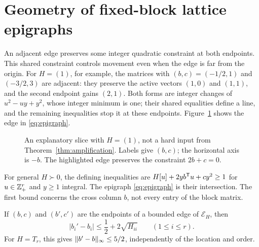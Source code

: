 \section{Geometry of fixed-block lattice epigraphs}\label{sec:movement}
An adjacent edge preserves some integer quadratic constraint at both endpoints. This shared constraint controls movement even when the edge is far from the origin. For $H=(1)$, for example, the matrices with $(b,c)=(-1/2,1)$ and $(-3/2,3)$ are adjacent: they preserve the active vectors $(1,0)$ and $(1,1)$, and the second endpoint gains $(2,1)$. Both forms are integer changes of $u^2-uy+y^2$, whose integer minimum is one; their shared equalities define a line, and the remaining inequalities stop it at these endpoints. Figure~\ref{fig:edge} shows the edge in \eqref{eq:epigraph}.

\begin{figure}[htbp]
\centering
{}
\caption{An explanatory slice with $H=(1)$, not a hard input from Theorem~\ref{thm:amplification}. Labels give $(b,c)$; the horizontal axis is $-b$. The highlighted edge preserves the constraint $2b+c=0$.}
\label{fig:edge}
\end{figure}

For general $H\succ0$, the defining inequalities are
$H[u]+2yb^{\mathsf T} u+cy^2\ge1$ for $u\in\mathbb Z_+^r$ and $y\ge1$ integral. The epigraph \eqref{eq:epigraph} is their intersection. The first bound concerns the cross column $b$, not every entry of the block matrix.

\begin{theorem}\label{thm:movement}
If $(b,c)$ and $(b',c')$ are the endpoints of a bounded edge of $\mathcal E_H$, then
\begin{equation}\label{eq:movement}
 |b_i'-b_i|\le\frac12+2\sqrt{H_{ii}}\qquad(1\le i\le r).
\end{equation}
For $H=T_r$, this gives $\lVert b'-b\rVert_\infty\le5/2$, independently of the location and order.
\end{theorem}

